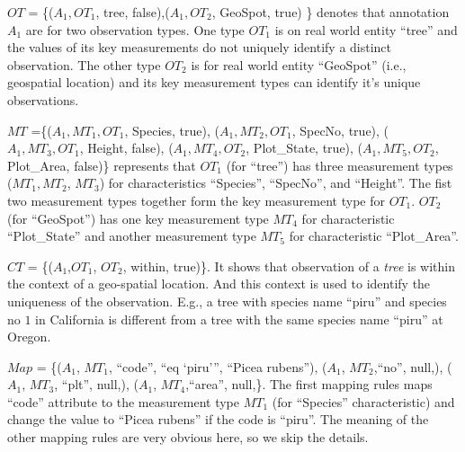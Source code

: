 \begin{example}
$OT$ = \{($A_1, OT_1$, tree, false),($A_1, OT_2$, GeoSpot, true) \}
  denotes that annotation $A_1$ are for two observation types. One
  type $OT_1$ is on real world entity ``tree'' and the values of its key measurements
  do not uniquely identify a distinct observation. The other type
  $OT_2$ is for real world entity ``GeoSpot'' (i.e., geospatial
  location) and its key measurement types can identify it's unique
  observations. 

$MT$ =\{($A_1, MT_1, OT_1$, Species, true), 
($A_1, MT_2, OT_1$, SpecNo, true), 
($A_1, MT_3, OT_1$, Height, false),
($A_1, MT_4, OT_2$, Plot\_State, true), 
($A_1, MT_5, OT_2$, Plot\_Area, false)\} represents that $OT_1$
(for ``tree'') has three measurement types ($MT_1, MT_2$, $MT_3$) for characteristics
``Species'', ``SpecNo'', and ``Height''. The fist two measurement
  types together form the key measurement type for $OT_1$. 
$OT_2$ (for ``GeoSpot'') has one key measurement type $MT_4$ for
  characteristic ``Plot\_State'' and another measurement type $MT_5$
  for characteristic ``Plot\_Area''. 

$CT$ = \{($A_1$,$OT_1$, $OT_2$, within, true)\}. It shows that
observation of a {\em tree} is within the context of a geo-spatial
location. And this context is used to identify the uniqueness of the
observation. E.g., a tree with species name ``piru'' and species no
$1$ in California
is different from a tree with 
the same species name ``piru'' at Oregon. 


$Map$ = \{($A_1$, $MT_1$, ``code'', ``eq `piru''', ``Picea rubens''),
($A_1$, $MT_2$,``no'', null,), 
($A_1$, $MT_3$, ``plt'', null,), 
($A_1$, $MT_4$,``area'', null,\}. 
The first mapping rules maps ``code''
attribute to the measurement type $MT_1$ (for ``Species''
characteristic) and change the value to ``Picea rubens'' if the code
is ``piru''. The meaning of the other mapping rules are very
obvious here, so we skip the details. 
\end{example}


